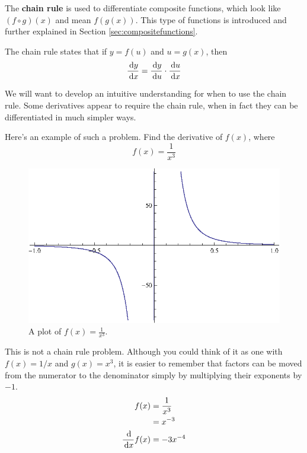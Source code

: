 The \textbf{chain rule} is used to differentiate composite functions, which look like $(f \circ g)(x)$ and mean $f(g(x))$.
This type of functions is introduced and further explained in Section \ref{sec:compositefunctions}.
\begin{theorem}
  The chain rule states that if $y=f(u)$ and $u=g(x)$, then
  \begin{equation}
    \frac{\,\mathrm{d} y}{\,\mathrm{d} x}=\frac{\,\mathrm{d} y}{\,\mathrm{d} u} \cdot \frac{\,\mathrm{d} u}{\,\mathrm{d} x}
  \end{equation}
\end{theorem}
We will want to develop an intuitive understanding for when to use the chain rule.
Some derivatives appear to require the chain rule, when in fact they can be differentiated in much simpler ways.
\begin{ex}
  Here's an example of such a problem.
  Find the derivative of $f(x)$, where
  \[ f(x)=\frac{1}{x^3} \]
  \begin{figure}[h]
    \begin{center}
      \includegraphics{continuous/derivatives/chainrule_1.eps}
    \end{center}
    \caption{A plot of $f(x)=\frac{1}{x^3}$.}
  \end{figure}
  \begin{sol}
    This is not a chain rule problem. Although you could think of it as one with $f(x)=1/x$ and $g(x)=x^3$, it is easier to remember that factors can be moved from the numerator to the denominator simply by multiplying their exponents by $-1$.
    \begin{align*}
      f(x)&=\frac{1}{x^3}\\&=x^{-3} \\
      \frac{\,\mathrm{d}}{\,\mathrm{d} x} f(x)&=-3x^{-4}
    \end{align*}
  \end{sol}
\end{ex}
